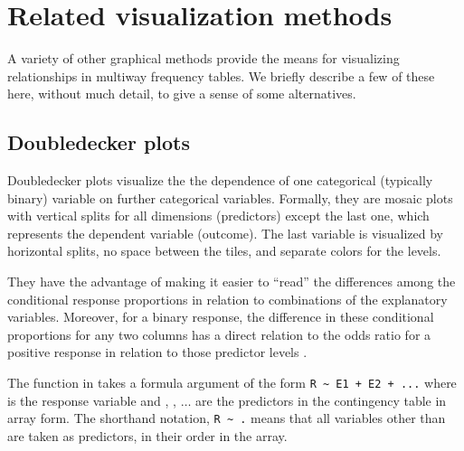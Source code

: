 \documentclass[10pt,krantz2]{krantz}\usepackage[]{graphicx}\usepackage[]{color}
\begin{document}
\section{Related visualization methods}\label{sec:related}

A variety of other graphical methods provide the means for visualizing relationships in multiway
frequency tables.  We briefly describe a few of these here, without much detail, to give a sense
of some alternatives.


\subsection{Doubledecker plots}\label{sec:doubledecker}

Doubledecker plots visualize the the dependence of one categorical (typically binary) variable on further categorical variables. Formally, they are mosaic plots with vertical splits for all dimensions (predictors) except the last one, which represents the dependent variable (outcome). The last variable is visualized by horizontal splits, no space between the tiles, and separate colors for the levels. 

They have the advantage of making it easier to ``read'' the differences among the conditional response proportions in relation to combinations of
the explanatory variables. Moreover, for a binary response, the difference in these conditional proportions for any two columns has a direct
relation to the odds ratio for a positive response in relation to those predictor levels \citep{Hofmann:2001}.

The  function in  takes a formula argument of the form \verb|R ~ E1 + E2 + ...|
where  is the response variable and , , $\dots$ are the predictors in the
contingency table in array form.  The shorthand notation, \verb|R ~ .| means that all variables other
than  are taken as predictors, in their order in the array.
\end{document}
